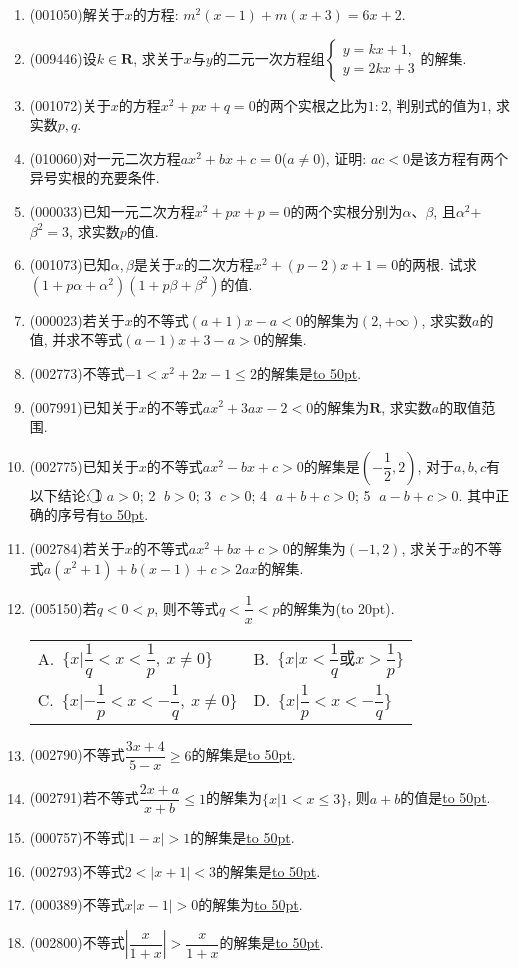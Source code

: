 \documentclass[10pt,a4paper]{article}
\newcommand{\blank}[1]{\underline{\hbox to #1pt{}}}
\newcommand{\bracket}[1]{(\hbox to #1pt{})}
\newcommand{\twoch}[4]{\par\begin{tabular}{p{.46\textwidth}p{.46\textwidth}}
A.~#1& B.~#2\\
C.~#3& D.~#4
\end{tabular}}
\begin{document}
\begin{enumerate}[1.]
\item {\tiny (001050)}解关于$x$的方程: $m^2(x-1)+m(x+3)=6x+2$.
\item {\tiny (009446)}设$k\in \mathbf{R}$, 求关于$x$与$y$的二元一次方程组$\begin{cases}y=kx+1, \\ y=2kx+3 \end{cases}$的解集.
\item {\tiny (001072)}关于$x$的方程$x^2+px+q=0$的两个实根之比为$1:2$, 判别式的值为$1$, 求实数$p,q$.
\item {\tiny (010060)}对一元二次方程$ax^2+bx+c=0$($a\ne 0$), 证明: $ac<0$是该方程有两个异号实根的充要条件.
\item {\tiny (000033)}已知一元二次方程$x^2+px+p=0$的两个实根分别为$\alpha$、$\beta$, 且$\alpha^2$+$\beta^2=3$, 求实数$p$的值.
\item {\tiny (001073)}已知$\alpha,\beta$是关于$x$的二次方程$x^2+(p-2)x+1=0$的两根. 试求$(1+p\alpha+\alpha^2)(1+p\beta+\beta^2)$的值.
\item {\tiny (000023)}若关于$x$的不等式$(a+1)x-a<0$的解集为$(2,+\infty)$, 求实数$a$的值, 并求不等式$(a-1)x+3-a>0$的解集.
\item {\tiny (002773)}不等式$-1<x^2+2x-1\le 2$的解集是\blank{50}.
\item {\tiny (007991)}已知关于$x$的不等式$ax^2+3ax-2<0$的解集为$\mathbf{R}$, 求实数$a$的取值范围.
\item {\tiny (002775)}已知关于$x$的不等式$ax^2-bx+c>0$的解集是$(-\dfrac 12,2)$, 对于$a,b,c$有以下结论: \textcircled{1} $a>0$; \textcircled{2} $b>0$; \textcircled{3} $c>0$; \textcircled{4} $a+b+c>0$; \textcircled{5} $a-b+c>0$. 其中正确的序号有\blank{50}.
\item {\tiny (002784)}若关于$x$的不等式$ax^2+bx+c>0$的解集为$(-1,2)$, 求关于$x$的不等式$a(x^2+1)+b(x-1)+c>2ax$的解集.
\item {\tiny (005150)}若$q<0<p$, 则不等式$q<\dfrac 1x<p$的解集为\bracket{20}.
\twoch{$\{x|\dfrac 1q<x<\dfrac 1p,\  x\ne 0\}$}{$\{x|x<\dfrac 1q\text{或}x>\dfrac 1p\}$}{$\{x|-\dfrac 1p<x<-\dfrac 1q, \ x\ne 0\}$}{$\{x|\dfrac 1p<x<-\dfrac 1q\}$}
\item {\tiny (002790)}不等式$\dfrac{3x+4}{5-x}\ge 6$的解集是\blank{50}.
\item {\tiny (002791)}若不等式$\dfrac{2x+a}{x+b}\le 1$的解集为$\{x|1<x\le 3\}$, 则$a+b$的值是\blank{50}.
\item {\tiny (000757)}不等式$|1-x|>1$的解集是\blank{50}.
\item {\tiny (002793)}不等式$2<|x+1|<3$的解集是\blank{50}.
\item {\tiny (000389)}不等式$x|x-1|>0$的解集为\blank{50}.
\item {\tiny (002800)}不等式$|\dfrac x{1+x}|>\dfrac x{1+x}$的解集是\blank{50}.
\end{enumerate}
\end{document}
